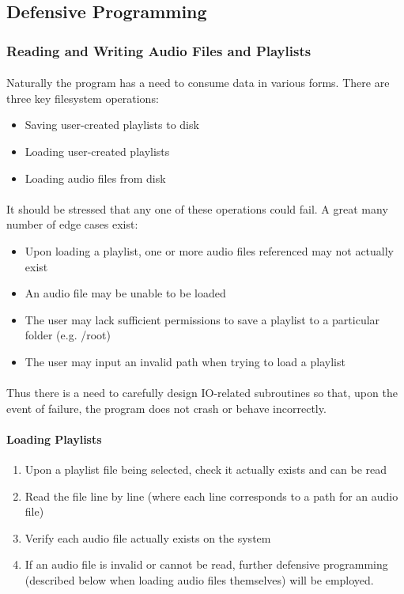 \pagebreak
\subsection{Defensive Programming}

\subsubsection{Reading and Writing Audio Files and Playlists}
\paragraph{}
Naturally the program has a need to consume data in various forms. There are three key filesystem operations:
\begin{itemize}
	\item Saving user-created playlists to disk
	\item Loading user-created playlists
	\item Loading audio files from disk
\end{itemize}

\paragraph{}
It should be stressed that any one of these operations could fail. A great many number of edge cases exist:
\begin{itemize}
	\item Upon loading a playlist, one or more audio files referenced may not actually exist
	\item An audio file may be unable to be loaded
	\item The user may lack sufficient permissions to save a playlist to a particular folder (e.g. /root)
	\item The user may input an invalid path when trying to load a playlist
\end{itemize}

\paragraph{}
Thus there is a need to carefully design IO-related subroutines so that, upon the event of failure, the program does not crash or behave incorrectly.

\paragraph{Loading Playlists}
\begin{enumerate}
	\item Upon a playlist file being selected, check it actually exists and can be read
	\item Read the file line by line (where each line corresponds to a path for an audio file)
	\item Verify each audio file actually exists on the system
	\item If an audio file is invalid or cannot be read, further defensive programming (described below when loading audio files themselves) will be employed.
\end{enumerate}

